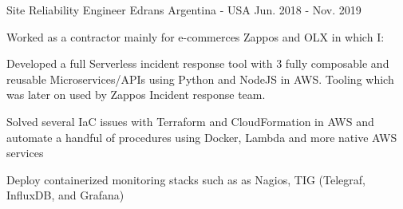 \begin{cventries}
	\cventry
	{Site Reliability Engineer} %
	{Edrans} %
	{Argentina - USA} %
	{Jun. 2018 - Nov. 2019} %
	{
		{Worked as a contractor mainly for e-commerces Zappos and OLX in which I:}
		\linebreak
		\begin{cvitems} %
			\item {Developed a full Serverless incident response tool with 3 fully composable and reusable Microservices/APIs using Python and NodeJS in AWS. Tooling which was later on used by Zappos Incident response team.}
			\item {Solved several IaC issues with Terraform and CloudFormation in AWS and automate a handful of procedures using Docker, Lambda and more native AWS services}
			\item {Deploy containerized monitoring stacks such as as Nagios, TIG (Telegraf, InfluxDB, and Grafana)}
		\end{cvitems}
	}




\end{cventries}
